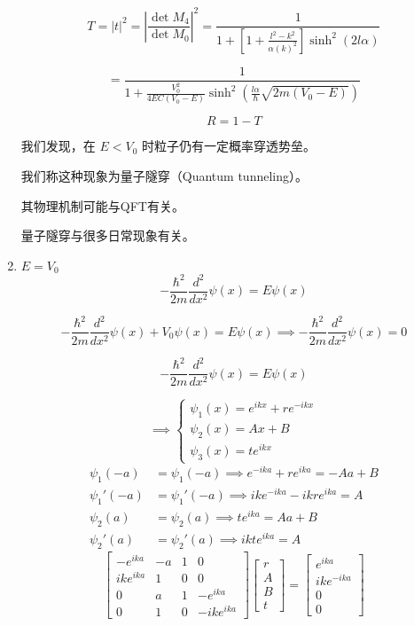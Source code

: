 \documentclass[lang=cn,10pt]{elegantbook}
\begin{document}
\begin{enumerate}
	\[
	T = |t|^2 = \left| \frac{\det M_4}{\det M_0} \right|^2 = \frac{1}{1 + \left[ 1 + \frac{l^2 - k^2}{\alpha(k)^2} \right] \sinh^2(2l\alpha)}
	\]
	
	\[
	= \frac{1}{1 + \frac{V_0^2}{4EC(V_0 - E)} \sinh^2 \left( \frac{l\alpha}{\hbar} \sqrt{2m(V_0 - E)} \right)}
	\]
	
	\[
	R = 1 - T
	\]
	
	我们发现，在 \( E < V_0 \) 时粒子仍有一定概率穿透势垒。
	
	我们称这种现象为量子隧穿（Quantum tunneling）。
	
	其物理机制可能与QFT有关。
	
	量子隧穿与很多日常现象有关。
	
	\item $E = V_0$
	\begin{equation*}
		-\frac{\hbar^2}{2m} \frac{d^2}{dx^2} \psi(x) = E \psi(x)
	\end{equation*}
	
	\begin{equation*}
		-\frac{\hbar^2}{2m} \frac{d^2}{dx^2} \psi(x) + V_0 \psi(x) = E \psi(x) \implies -\frac{\hbar^2}{2m} \frac{d^2}{dx^2} \psi(x) = 0
	\end{equation*}
	
	\begin{equation*}
		-\frac{\hbar^2}{2m} \frac{d^2}{dx^2} \psi(x) = E \psi(x)
	\end{equation*}
	
	\begin{equation*}
		\implies
		\begin{cases}
			\psi_1(x) = e^{ikx} + re^{-ikx} \\
			\psi_2(x) = Ax + B \\
			\psi_3(x) = te^{ikx}
		\end{cases}
	\end{equation*}
	\begin{align*}
		\psi_1(-a) &= \psi_1(-a) \implies e^{-ika} + re^{ika} = -Aa + B \\
		\psi_1'(-a) &= \psi_1'(-a) \implies ike^{-ika} - ikre^{ika} = A \\
		\psi_2(a) &= \psi_2(a) \implies te^{ika} = Aa + B \\
		\psi_2'(a) &= \psi_2'(a) \implies ikte^{ika} = A
	\end{align*}
	\[
	\begin{bmatrix}
		-e^{ika} & -a & 1 & 0 \\
		ike^{ika} & 1 & 0 & 0 \\
		0 & a & 1 & -e^{ika} \\
		0 & 1 & 0 & -ike^{ika}
	\end{bmatrix}
	\begin{bmatrix}
		r \\
		A \\
		B \\
		t
	\end{bmatrix}
	=
	\begin{bmatrix}
		e^{ika} \\
		ike^{-ika} \\
		0 \\
		0
	\end{bmatrix}
	\]
	

\end{enumerate}
\end{document}
